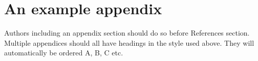 \documentclass[3p,times,procedia]{elsarticle}
\begin{document}

\appendix
\section{An example appendix}
Authors including an appendix section should do so before References section. Multiple appendices should all have headings in the style used above. They will automatically be ordered A, B, C etc.





 
\end{document}
